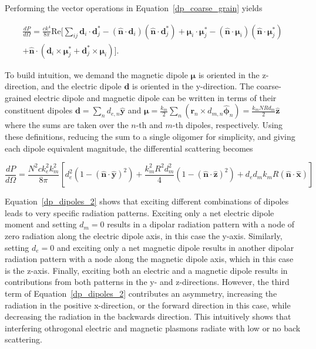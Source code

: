 \documentclass[journal=apchd5,manuscript=article]{achemso}
\begin{document}
Performing the vector operations in Equation~\ref{dp_coarse_grain} yields

\begin{multline}
\frac{dP}{d\Omega} = \frac{ck^4}{8\pi} \textrm{Re} [ \sum_{ij} \textbf{d}_i \cdot \textbf{d}_j^* - (\hat{\textbf{n}} \cdot \textbf{d}_i)(\hat{\textbf{n}} \cdot \textbf{d}_j^*) + \boldsymbol{\mu}_i \cdot \boldsymbol{\mu}_j^* - (\hat{\textbf{n}} \cdot \boldsymbol{\mu}_i)(\hat{\textbf{n}} \cdot \boldsymbol{\mu}_j^*) \\ + \hat{\textbf{n}} \cdot (\textbf{d}_i \times \boldsymbol{\mu}_j^* + \textbf{d}_j^* \times \boldsymbol{\mu}_i) ].
\label{dp_dipoles_1}
\end{multline}

\noindent To build intuition, we demand the magnetic dipole $\boldsymbol{\mu}$ is oriented in the z-direction, and the electric dipole $\textbf{d}$ is oriented in the y-direction. The coarse-grained electric dipole and magnetic dipole can be written in terms of their constituent dipoles $\textbf{d} = \sum_n d_{e,n} \hat{\textbf{y}}$ and $\boldsymbol{\mu} = \frac{k_m}{2}\sum_n(\textbf{r}_n \times d_{m,n} \hat{\boldsymbol{\phi}}_n) = \frac{k_mNRd_m}{2}\hat{\textbf{z}}$ where the sums are taken over the $n$-th and $m$-th dipoles, respectively. Using these definitions, reducing the sum to a single oligomer for simplicity, and giving each dipole equivalent magnitude, the differential scattering becomes

\begin{equation}
\frac{dP}{d\Omega} = \frac{N^2ck_e^2k_m^2}{8\pi}\left[ d_e^2(1 - (\hat{\textbf{n}} \cdot \hat{\textbf{y}})^2) + \frac{k_m^2R^2d_m^2}{4}(1 - (\hat{\textbf{n}} \cdot \hat{\textbf{z}})^2) + d_ed_mk_mR(\hat{\textbf{n}} \cdot \hat{\textbf{x}})\right]
\label{dp_dipoles_2}
\end{equation}

Equation~\ref{dp_dipoles_2} shows that exciting different combinations of dipoles leads to very specific radiation patterns. Exciting only a net electric dipole moment and setting $d_m = 0$ results in a dipolar radiation pattern with a node of zero radiation along the electric dipole axis, in this case the y-axis. Similarly, setting $d_e = 0$ and exciting only a net magnetic dipole results in another dipolar radiation pattern with a node along the magnetic dipole axis, which in this case is the z-axis. Finally, exciting both an electric and a magnetic dipole results in contributions from both patterns in the y- and z-directions. However, the third term of Equation~\ref{dp_dipoles_2} contributes an asymmetry, increasing the radiation in the positive x-direction, or the forward direction in this case, while decreasing the radiation in the backwards direction. This intuitively shows that interfering othrogonal electric and magnetic plasmons radiate with low or no back scattering\cite{Dionne2011}.
\end{document}
